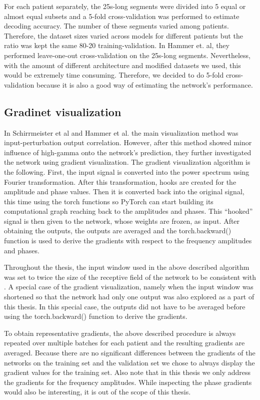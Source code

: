 For each patient separately, the 25s-long segments were divided into 5 equal or almost equal subsets and a 5-fold cross-validation was performed to estimate decoding accuracy.
The number of these segments varied among patients.
Therefore, the dataset sizes varied across models for different patients but the ratio was kept the same 80-20 training-validation.
In Hammer et. al, they performed leave-one-out cross-validation on the 25s-long segments.
Nevertheless, with the amount of different architecture and modified datasets we used, this would be extremely time consuming.
Therefore, we decided to do 5-fold cross-validation because it is also a good way of estimating the network's performance.


\subsection{Gradinet visualization}
In Schirrmeister et al and Hammer et al. the main visualization method was input-perturbation output correlation.
However, after this method showed minor influence of high-gamma onto the network’s prediction, they further investigated the network using gradient visualization.
The gradient visualization algorithm is the following.
First, the input signal is converted into the power spectrum using Fourier transformation.
After this transformation, hooks are created for the amplitude and phase values.
Then it is converted back into the original signal, this time using the torch functions so PyTorch can start building its computational graph reaching back to the amplitudes and phases.
This “hooked” signal is then given to the network, whose weights are frozen, as input.
After obtaining the outputs, the outputs are averaged and the torch.backward() function is used to derive the gradients with respect to the frequency amplitudes and phases.

Throughout the thesis, the input window used in the above described algorithm was set to twice the size of the receptive field of the network to be consistent with \cite{Hammer_2021}.
A special case of the gradient visualization, namely when the input window was shortened so that the network had only one output was also explored as a part of this thesis.
In this special case, the outputs did not have to be averaged before using the torch.backward() function to derive the gradients.

To obtain representative gradients, the above described procedure is always repeated over multiple batches for each patient and the resulting gradients are averaged.
Because there are no significant differences between the gradients of the networks on the training set and the validation set we chose to always display the gradient values for the training set.
Also note that in this thesis we only address the gradients for the frequency amplitudes.
While inspecting the phase gradients would also be interesting, it is out of the scope of this thesis.


